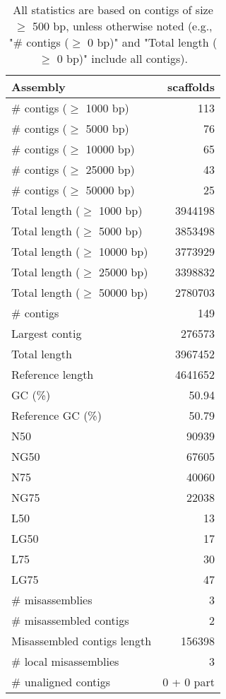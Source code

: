 \documentclass[12pt,a4paper]{article}
\begin{document}
\begin{table}[ht]
\begin{center}
\caption{All statistics are based on contigs of size $\geq$ 500 bp, unless otherwise noted (e.g., "\# contigs ($\geq$ 0 bp)" and "Total length ($\geq$ 0 bp)" include all contigs).}
\begin{tabular}{|l*{1}{|r}|}
\hline
Assembly & scaffolds \\ \hline
\# contigs ($\geq$ 1000 bp) & 113 \\ \hline
\# contigs ($\geq$ 5000 bp) & 76 \\ \hline
\# contigs ($\geq$ 10000 bp) & 65 \\ \hline
\# contigs ($\geq$ 25000 bp) & 43 \\ \hline
\# contigs ($\geq$ 50000 bp) & 25 \\ \hline
Total length ($\geq$ 1000 bp) & 3944198 \\ \hline
Total length ($\geq$ 5000 bp) & 3853498 \\ \hline
Total length ($\geq$ 10000 bp) & 3773929 \\ \hline
Total length ($\geq$ 25000 bp) & 3398832 \\ \hline
Total length ($\geq$ 50000 bp) & 2780703 \\ \hline
\# contigs & 149 \\ \hline
Largest contig & 276573 \\ \hline
Total length & 3967452 \\ \hline
Reference length & 4641652 \\ \hline
GC (\%) & 50.94 \\ \hline
Reference GC (\%) & 50.79 \\ \hline
N50 & 90939 \\ \hline
NG50 & 67605 \\ \hline
N75 & 40060 \\ \hline
NG75 & 22038 \\ \hline
L50 & 13 \\ \hline
LG50 & 17 \\ \hline
L75 & 30 \\ \hline
LG75 & 47 \\ \hline
\# misassemblies & 3 \\ \hline
\# misassembled contigs & 2 \\ \hline
Misassembled contigs length & 156398 \\ \hline
\# local misassemblies & 3 \\ \hline
\# unaligned contigs & 0 + 0 part \\ \hline

\end{tabular}
\end{center}
\end{table}
\end{document}
